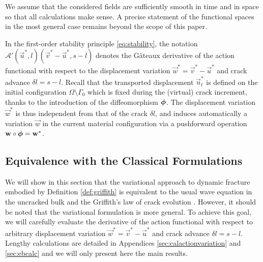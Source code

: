\begin{remark}
We assume that the considered fields are sufficiently smooth in time and in space so that all calculations make sense. A precise statement of the functional spaces in the most general case remains beyond the scope of this paper.
\end{remark}

In the first-order stability principle \eqref{eq:stability}, the notation $\mathcal{A}'(\vec{u}^*,l)(\vec{v}^*-\vec{u}^*,s-l)$ denotes the Gâteaux derivative of the action functional with respect to the displacement variation $\vec{w}^*=\vec{v}^*-\vec{u}^*$ and crack advance $\delta l=s-l$. Recall that the transported displacement $\vec{u}_t^*$ is defined on the initial configuration $\Omega\setminus\Gamma_0$ which is fixed during the (virtual) crack increment, thanks to the introduction of the diffeomorphism $\philt$. The displacement variation $\vec{w}^*$ is thus independent from that of the crack $\delta l$, and induces automatically a variation $\vec{w}$ in the current material configuration via a pushforward operation $\vec{w}\circ\philt=\vec{w}^*$.

\subsection{Equivalence with the Classical Formulations}
We will show in this section that the variational approach to dynamic fracture embodied by Definition \ref{def:griffith} is equivalent to the usual wave equation in the uncracked bulk and the Griffith's law of crack evolution \cite{Freund:1990}. However, it should be noted that the variational formulation is more general. To achieve this goal, we will carefully evaluate the derivative of the action functional with respect to arbitrary displacement variation $\vec{w}^*=\vec{v}^*-\vec{u}^*$ and crack advance $\delta l=s-l$. Lengthy calculations are detailed in Appendices \ref{sec:calactionvariation} and \ref{sec:ebcalc} and we will only present here the main results.

